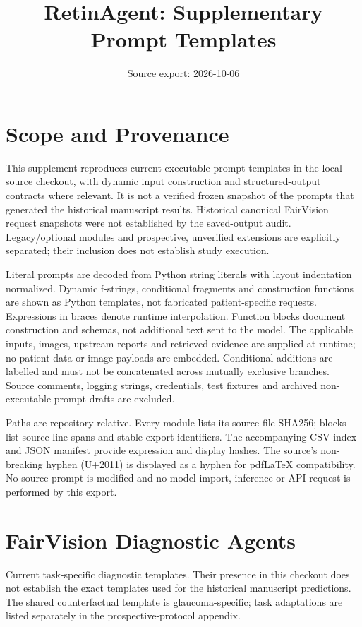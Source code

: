\documentclass[10pt]{article}
\title{RetinAgent: Supplementary Prompt Templates}
\author{}
\date{Source export: 2026-10-06}
\begin{document}
\maketitle
\section*{Scope and Provenance}
This supplement reproduces current executable prompt templates in the local source checkout, with dynamic input construction and structured-output contracts where relevant. It is not a verified frozen snapshot of the prompts that generated the historical manuscript results. Historical canonical FairVision request snapshots were not established by the saved-output audit. Legacy/optional modules and prospective, unverified extensions are explicitly separated; their inclusion does not establish study execution.

Literal prompts are decoded from Python string literals with layout indentation normalized. Dynamic f-strings, conditional fragments and construction functions are shown as Python templates, not fabricated patient-specific requests. Expressions in braces denote runtime interpolation. Function blocks document construction and schemas, not additional text sent to the model. The applicable inputs, images, upstream reports and retrieved evidence are supplied at runtime; no patient data or image payloads are embedded. Conditional additions are labelled and must not be concatenated across mutually exclusive branches. Source comments, logging strings, credentials, test fixtures and archived non-executable prompt drafts are excluded.

Paths are repository-relative. Every module lists its source-file SHA256; blocks list source line spans and stable export identifiers. The accompanying CSV index and JSON manifest provide expression and display hashes. The source's non-breaking hyphen (U+2011) is displayed as a hyphen for pdfLaTeX compatibility. No source prompt is modified and no model import, inference or API request is performed by this export.

\tableofcontents
\clearpage
\section{FairVision Diagnostic Agents}
Current task-specific diagnostic templates. Their presence in this checkout does not establish the exact templates used for the historical manuscript predictions. The shared counterfactual template is glaucoma-specific; task adaptations are listed separately in the prospective-protocol appendix.
\end{document}
